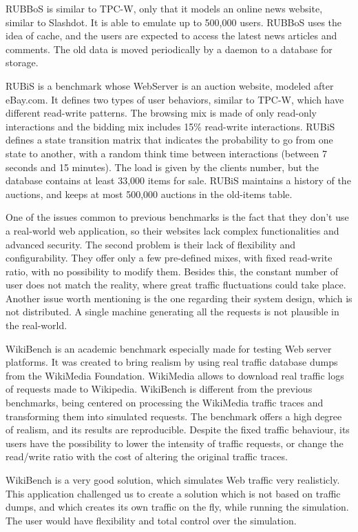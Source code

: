 RUBBoS is similar to TPC-W, only that it models an online news website, similar to Slashdot. It is able to emulate up to 500,000 users. RUBBoS uses the idea of cache, and the users are expected to access the latest news articles and comments. The old data is moved periodically by a daemon to a database for storage.

RUBiS is a benchmark whose WebServer is an auction website, modeled after eBay.com. It defines two types of user behaviors, similar to TPC-W, which have different read-write patterns. The browsing mix is made of only read-only interactions and the bidding mix includes 15\% read-write interactions. RUBiS defines a state transition matrix that indicates the probability to go from one state to another, with a random think time between interactions (between 7 seconds and 15 minutes). The load is given by the clients number, but the database contains at least 33,000 items for sale.  RUBiS maintains a history of the auctions, and keeps at most 500,000 auctions in the old-items table.

One of the issues common to previous benchmarks is the fact that they don't use a real-world web application, so their websites lack complex functionalities and advanced security. The second problem is their lack of flexibility and configurability. They offer only a few pre-defined mixes, with fixed read-write ratio, with no possibility to modify them. Besides this, the constant number of user does not match the reality, where great traffic fluctuations could take place. Another issue worth mentioning is the one regarding their system design, which is not distributed. A single machine generating all the requests is not plausible in the real-world.

WikiBench is an academic benchmark especially made for testing Web server platforms. It was created to bring realism by using real traffic database dumps from the WikiMedia Foundation. WikiMedia allows to download real traffic logs of requests made to Wikipedia.  WikiBench is different from the previous benchmarks, being centered on processing the WikiMedia traffic traces and transforming them into simulated requests. The benchmark offers a high degree of realism, and its results are reproducible. Despite the fixed traffic behaviour, its users have the possibility to lower the intensity of traffic requests, or change the read/write ratio with the cost of altering the original traffic traces.

WikiBench is a very good solution, which simulates Web traffic very realisticly. This application challenged us to create a solution which is not based on traffic dumps, and which creates its own traffic on the fly, while running the simulation. The user would have flexibility and total control over the simulation.
